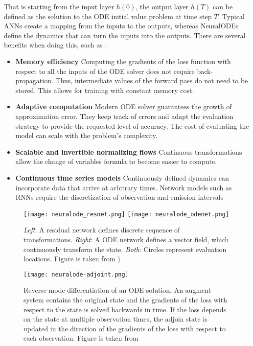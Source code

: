 That is starting from the input layer $h(0)$, the output layer $h(T)$ can be defined as the solution to the \gls{ODE} initial value problem at time step $T$.
Typical \glspl{ANN} create a mapping from the inputs to the outputs, whereas \glspl{NeuralODE} define the dynamics that can turn the inputs into the outputs.
There are several benefits when doing this, such as \cite{chenNeuralOrdinaryDifferential2019}:
\begin{itemize}
    \item \textbf{Memory efficiency}
    Computing the gradients of the loss function with respect to all the inputs of the \gls{ODE} solver does not require back-propagation.
    Thus, intermediate values of the forward pass do not need to be stored.
    This allows for training with constant memory cost.
    \item \textbf{Adaptive computation}
    Modern \gls{ODE} solver guarantees the growth of approximation error.
    They keep track of errors and adapt the evaluation strategy to provide the requested level of accuracy.
    The cost of evaluating the model can scale with the problem's complexity.
    \item \textbf{Scalable and invertible normalizing flows}
    Continuous transformations allow the change of variables formula to become easier to compute.
    \item \textbf{Continuous time series models}
    Continuously defined dynamics can incorporate data that arrive at arbitrary times.
    Network models such as \glspl{RNN} require the discretization of observation and emission intervals
\end{itemize}

\begin{figure}[h]
    \centering
    \texttt{[image: neuralode\_resnet.png]}
    \texttt{[image: neuralode\_odenet.png]}
    \caption{\textit{Left}: A residual network defines discrete sequence of transformations. \textit{Right}: A ODE network defines a vector field, which continuously transform the state. \textit{Both}: Circles represent evaluation locations. Figure is taken from \cite{chenNeuralOrdinaryDifferential2019})}
    \label{fig:resnet-vs-odenet}
\end{figure}

\begin{figure}[h]
    \centering
    \texttt{[image: neuralode-adjoint.png]}
    \caption{Reverse-mode differentiation of an ODE solution. An augment system contains the original state and the gradients of the loss with respect to the state is solved backwards in time. If the loss depends on the state at multiple observation times, the adjoin state is updated in the direction of the gradients of the loss with respect to each observation. Figure is taken from \cite{chenNeuralOrdinaryDifferential2019}}
    \label{fig:neuralode-adjoint}
\end{figure}

